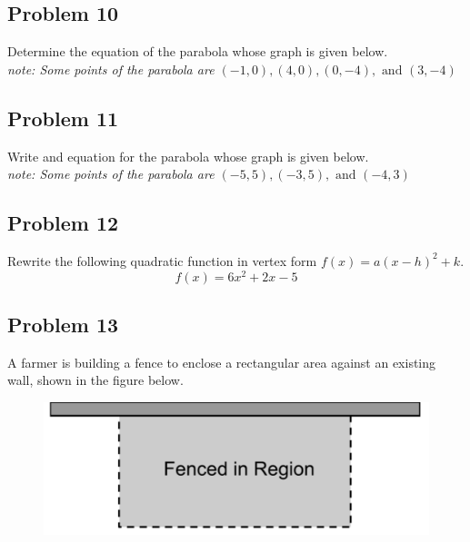 \documentclass[12pt]{article}
\begin{document}
\subsection*{Problem 10}
Determine the equation of the parabola whose graph is given below.\\
\textit{note: Some points of the parabola are \((-1,0),(4,0),(0,-4), \text{ and } (3,-4)\)}

\begin{center}
\end{center}

\subsection*{Problem 11}
Write and equation for the parabola whose graph is given below.\\
\textit{note: Some points of the parabola are \((-5,5),(-3,5), \text{ and } (-4,3)\)}

\begin{center}
\end{center}

\subsection*{Problem 12}
Rewrite the following quadratic function in vertex form \(f(x)=a(x-h)^2+k\).
\[f(x)=6x^2+2x-5\]

\subsection*{Problem 13}
A farmer is building a fence to enclose a rectangular area against an existing wall, shown in the figure below.\\
\begin{figure}[!ht]
    \centering
    \includegraphics[width=0.5\linewidth]{6.png}
\end{figure}
\end{document}
